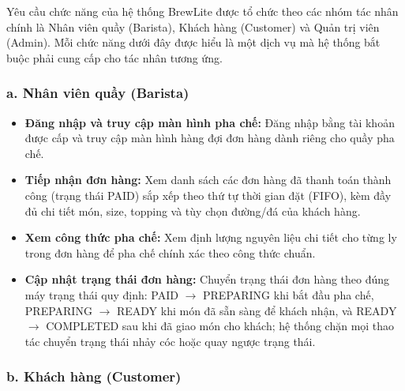 \documentclass[12pt,a4paper]{report}
\begin{document}
Yêu cầu chức năng của hệ thống BrewLite được tổ chức theo các nhóm tác nhân chính là Nhân viên quầy (Barista), Khách hàng (Customer) và Quản trị viên (Admin). Mỗi chức năng dưới đây được hiểu là một dịch vụ mà hệ thống bắt buộc phải cung cấp cho tác nhân tương ứng.

\subsubsection*{a. Nhân viên quầy (Barista)}

\begin{itemize}[leftmargin=*]
\item \textbf{Đăng nhập và truy cập màn hình pha chế:} Đăng nhập bằng tài khoản được cấp và truy cập màn hình hàng đợi đơn hàng dành riêng cho quầy pha chế.
\item \textbf{Tiếp nhận đơn hàng:} Xem danh sách các đơn hàng đã thanh toán thành công (trạng thái PAID) sắp xếp theo thứ tự thời gian đặt (FIFO), kèm đầy đủ chi tiết món, size, topping và tùy chọn đường/đá của khách hàng.
\item \textbf{Xem công thức pha chế:} Xem định lượng nguyên liệu chi tiết cho từng ly trong đơn hàng để pha chế chính xác theo công thức chuẩn.
\item \textbf{Cập nhật trạng thái đơn hàng:} Chuyển trạng thái đơn hàng theo đúng máy trạng thái quy định: PAID $\rightarrow$ PREPARING khi bắt đầu pha chế, PREPARING $\rightarrow$ READY khi món đã sẵn sàng để khách nhận, và READY $\rightarrow$ COMPLETED sau khi đã giao món cho khách; hệ thống chặn mọi thao tác chuyển trạng thái nhảy cóc hoặc quay ngược trạng thái.
\end{itemize}

\subsubsection*{b. Khách hàng (Customer)}
\end{document}
